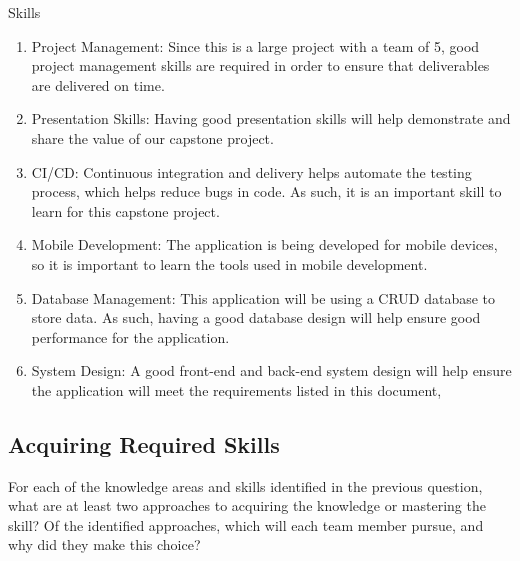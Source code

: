 \documentclass[12pt]{article}
\begin{document}
Skills
\begin{enumerate}
  \item Project Management: Since this is a large project with a team of 5, good project management skills are required in order to ensure that deliverables are delivered on time.
  \item Presentation Skills: Having good presentation skills will help demonstrate and share the value of our capstone project.
  \item CI/CD: Continuous integration and delivery helps automate the testing process, which helps reduce bugs in code. As such, it is an important skill to learn for this capstone project.  
  \item Mobile Development: The application is being developed for mobile devices, so it is important to learn the tools used in mobile development. 
  \item Database Management: This application will be using a CRUD database to store data. As such, having a good database design will help ensure good performance for the application.
  \item System Design: A good front-end and back-end system design will help ensure the application will meet the requirements listed in this document,
\end{enumerate}

\subsection*{Acquiring Required Skills}
For each of the knowledge areas and skills identified in the previous question, what are at least two approaches to acquiring the knowledge or  mastering the skill?  Of the identified approaches, which will each team  member pursue, and why did they make this choice?
\end{document}
